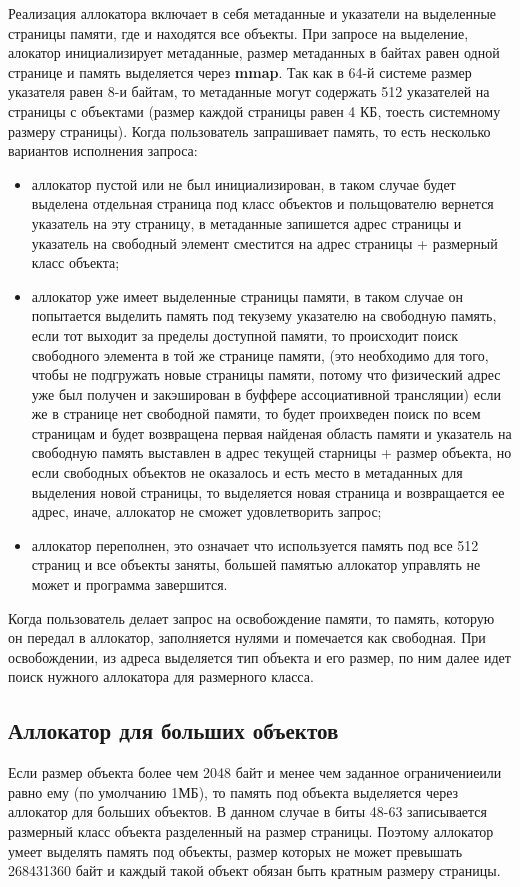 Реализация аллокатора включает в себя метаданные и указатели на выделенные страницы памяти, где и находятся все объекты. При запросе на выделение, алокатор инициализирует метаданные, размер метаданных в байтах равен одной странице и память выделяется через \textbf{mmap}. Так как в 64-й системе размер указателя равен 8-и байтам, то метаданные могут содержать 512 указателей на страницы с объектами (размер каждой страницы равен 4 КБ, тоесть системному размеру страницы). Когда пользователь запрашивает память, то есть несколько вариантов исполнения запроса:
\begin{itemize}
	\item аллокатор пустой или не был инициализирован, в таком случае будет выделена отдельная страница под класс объектов и польщователю вернется указатель на эту страницу, в метаданные запишется адрес страницы и указатель на свободный элемент сместится на адрес страницы + размерный класс объекта;
	\item аллокатор уже имеет выделенные страницы памяти, в таком случае он попытается выделить память под текузему указателю на свободную память, если тот выходит за пределы доступной памяти, то происходит поиск свободного элемента в той же странице памяти, (это необходимо для того, чтобы не подгружать новые страницы памяти, потому что физический адрес уже был получен и закэширован в буффере ассоциативной трансляции) если же в странице нет свободной памяти, то будет проихведен поиск по всем страницам и будет возвращена первая найденая область памяти и указатель на свободную память выставлен в адрес текущей старницы + размер объекта, но если свободных объектов не оказалось и есть место в метаданных для выделения новой страницы, то выделяется новая страница и возвращается ее адрес, иначе, аллокатор не сможет удовлетворить запрос;
	\item аллокатор переполнен, это означает что используется память под все 512 страниц и все объекты заняты, большей памятью аллокатор управлять не может и программа завершится.
\end{itemize}

Когда пользователь делает запрос на освобождение памяти, то память, которую он передал в аллокатор, заполняется нулями и помечается как свободная. При освобождении, из адреса выделяется тип объекта и его размер, по ним далее идет поиск нужного аллокатора для размерного класса.

\subsection{Аллокатор для больших объектов}
Если размер объекта более чем 2048 байт и менее чем заданное ограничениеили равно ему (по умолчанию 1МБ), то память под объекта выделяется через аллокатор для больших объектов. В данном случае в биты 48-63 записывается размерный класс объекта разделенный на размер страницы. Поэтому аллокатор умеет выделять память под объекты, размер которых не может превышать 268431360 байт и каждый такой объект обязан быть кратным размеру страницы.

